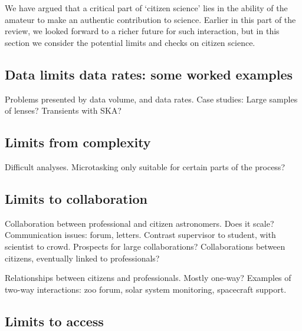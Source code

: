 \documentclass{ar2e}
\begin{document}
We have argued that a critical part of `citizen science' lies in the ability of
the amateur to make an authentic contribution to science. Earlier in this part
of the review, we looked forward to a richer future for such interaction, but in
this section we consider the potential limits and checks on citizen science. 


\subsection{Data limits data rates: some worked examples}
\label{sec:limits:data}

Problems presented by data volume, and data rates. 
Case studies: Large samples of lenses?  Transients with SKA? 



\subsection{Limits from complexity}
\label{sec:limits:complexity}

Difficult analyses. Microtasking only suitable for certain parts of the process?



\subsection{Limits to collaboration}
\label{sec:limits:collab}

Collaboration between professional and citizen astronomers. Does it scale?
Communication issues: forum, letters. Contrast supervisor to student, with
scientist to crowd. Prospects for large collaborations? Collaborations between
citizens, eventually linked to professionals?

Relationships between citizens and professionals. Mostly one-way? Examples of
two-way interactions: zoo forum, solar system monitoring, spacecraft support.



\subsection{Limits to access}
\label{sec:limits:access}
\end{document}
